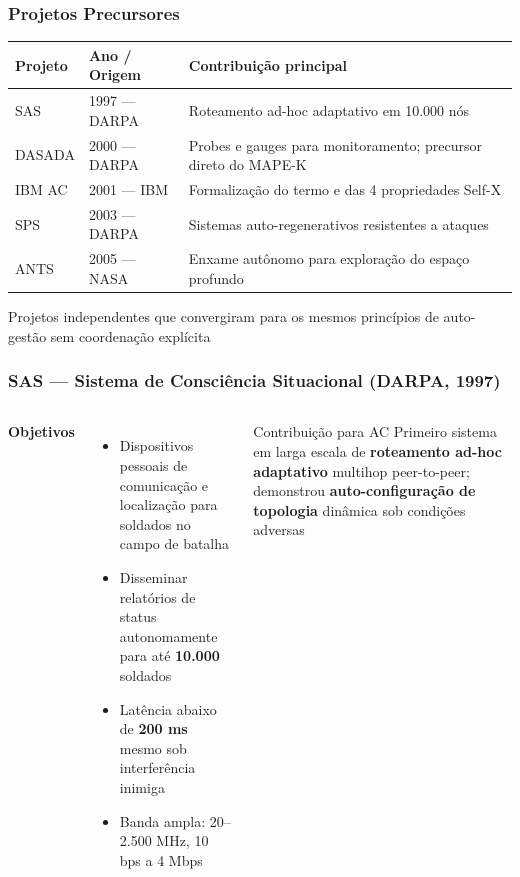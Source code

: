 \documentclass{beamer}
\begin{document}
  \begin{frame}
    \frametitle{Projetos Precursores}
    \small
    \begin{tabular}{llp{4.8cm}}
      \toprule
      \textbf{Projeto} & \textbf{Ano / Origem} & \textbf{Contribuição principal} \\
      \midrule
      SAS    & 1997 --- DARPA & Roteamento ad-hoc adaptativo em 10.000 nós \\
      DASADA & 2000 --- DARPA & Probes e gauges para monitoramento; precursor direto do MAPE-K \\
      IBM AC & 2001 --- IBM   & Formalização do termo e das 4 propriedades Self-X \\
      SPS    & 2003 --- DARPA & Sistemas auto-regenerativos resistentes a ataques \\
      ANTS   & 2005 --- NASA  & Enxame autônomo para exploração do espaço profundo \\
      \bottomrule
    \end{tabular}
    \vspace{0.3cm}
    \begin{block}{}
      Projetos independentes que convergiram para os mesmos princípios de auto-gestão sem coordenação explícita
    \end{block}
  \end{frame}

  \begin{frame}
    \frametitle{SAS --- Sistema de Consciência Situacional (DARPA, 1997)}
    \begin{columns}
      \textbf{Objetivos}
      \begin{itemize}
        \footnotesize
        \item Dispositivos pessoais de comunicação e localização para soldados no campo de batalha
        \item Disseminar relatórios de status autonomamente para até \textbf{10.000} soldados
        \item Latência abaixo de \textbf{200 ms} mesmo sob interferência inimiga
        \item Banda ampla: 20--2.500 MHz, 10 bps a 4 Mbps
      \end{itemize}
      \begin{block}{\footnotesize Contribuição para AC}
        \footnotesize
        Primeiro sistema em larga escala de \textbf{roteamento ad-hoc adaptativo} multihop peer-to-peer; demonstrou \textbf{auto-configuração de topologia} dinâmica sob condições adversas
      \end{block}
    \end{columns}
    \vspace{0.15cm}
  \end{frame}
\end{document}
